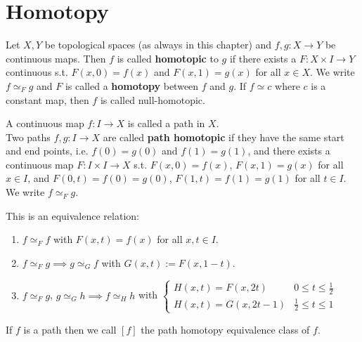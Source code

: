 \section{Homotopy}
\begin{definition}\label{2.1}
    Let $X,Y$ be topological spaces (as always in this chapter) and $f,g:X\to Y$ be continuous maps. Then $f$ is called \textbf{homotopic} to $g$ if there exists a $F:X\times I\to Y$ continuous s.t. $F(x,0)=f(x)$ and $F(x,1)=g(x)$ for all $x\in X$. We write $f\simeq_F g$ and $F$ is called a \textbf{homotopy} between $f$ and $g$. If $f\simeq c$ where $c$ is a constant map, then $f$ is called null-homotopic.
\end{definition}
\begin{definition}\label{2.2}
A continuous map $f:I\to X$ is called a path in $X$.\\
    Two paths $f,g:I\to X$ are called \textbf{path homotopic} if they have the same start and end points, i.e. $f(0)=g(0)$ and $f(1)=g(1)$, and there exists a continuous map $F:I\times I\to X$ s.t. $F(x,0)=f(x)$, $F(x,1)=g(x)$ for all $x\in I$, and $F(0,t)=f(0)=g(0)$, $F(1,t)=f(1)=g(1)$ for all $t\in I$. We write $f\simeq_F g$.
\end{definition}
\begin{remark}\label{2.3}
    This is an equivalence relation:
    \begin{enumerate}
        \item $f\simeq_F f$ with $F(x,t)=f(x)$ for all $x,t\in I$.
        \item $f\simeq_F g \implies g\simeq_G f$ with $G(x,t):=F(x,1-t)$.
        \item $f\simeq_F g$, $g\simeq_G h \implies f\simeq_H h$ with $\begin{cases}
            H(x,t)=F(x,2t) & 0\leq t\leq \frac{1}{2}\\
            H(x,t)=G(x,2t-1) & \frac{1}{2}\leq t\leq 1
        \end{cases}$
    \end{enumerate}
    If $f$ is a path then we call $[f]$ the path homotopy equivalence class of $f$. 
\end{remark}  
